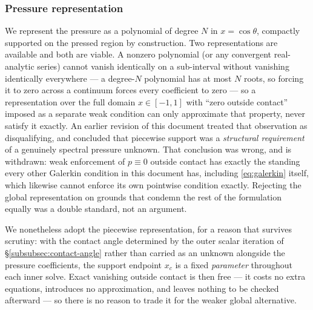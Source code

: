 \subsubsection{Pressure representation}
\label{subsubsec:pressure-representation}
We represent the pressure as a polynomial of degree $N$ in $x=\cos\theta$, compactly supported on the pressed region by construction. Two representations are available and both are viable. A nonzero polynomial (or any convergent real-analytic series) cannot vanish identically on a sub-interval without vanishing identically everywhere --- a degree-$N$ polynomial has at most $N$ roots, so forcing it to zero across a continuum forces every coefficient to zero --- so a representation over the full domain $x\in[-1,1]$ with ``zero outside contact'' imposed as a separate weak condition can only approximate that property, never satisfy it exactly. An earlier revision of this document treated that observation as disqualifying, and concluded that piecewise support was a \emph{structural requirement} of a genuinely spectral pressure unknown. That conclusion was wrong, and is withdrawn: weak enforcement of $p\equiv0$ outside contact has exactly the standing every other Galerkin condition in this document has, including \eqref{eq:galerkin} itself, which likewise cannot enforce its own pointwise condition exactly. Rejecting the global representation on grounds that condemn the rest of the formulation equally was a double standard, not an argument.

We nonetheless adopt the piecewise representation, for a reason that survives scrutiny: with the contact angle determined by the outer scalar iteration of \S\ref{subsubsec:contact-angle} rather than carried as an unknown alongside the pressure coefficients, the support endpoint $x_c$ is a fixed \emph{parameter} throughout each inner solve. Exact vanishing outside contact is then free --- it costs no extra equations, introduces no approximation, and leaves nothing to be checked afterward --- so there is no reason to trade it for the weaker global alternative.

